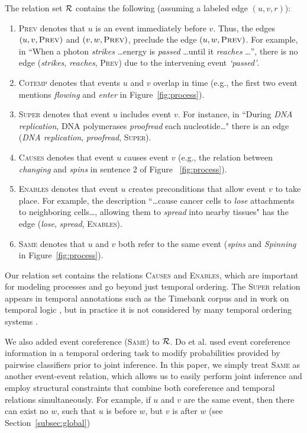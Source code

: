 The relation set $\mathcal{R}$ contains the following (assuming a labeled edge $(u,v,r)$):
\begin{enumerate}[itemsep=0pt,topsep=0pt] 
\item \textsc{Prev} denotes that $u$ is an event immediately before $v$. Thus, the edges $(u,v,\mbox{\textsc{Prev}})$ and $(v,w,\mbox{\textsc{Prev}})$, preclude the edge $(u,w,\mbox{\textsc{Prev}})$. For example, in ``When a photon \emph{strikes} \ldots energy is  \emph{passed} \ldots until it \emph{reaches} \ldots'', there is no edge (\emph{strikes}, \emph{reaches}, \textsc{Prev}) due to the intervening event \emph{`passed'}.
\item \textsc{Cotemp} denotes that events $u$ and $v$ overlap in time (e.g., the first two event mentions \emph{flowing} and \emph{enter} in Figure~\ref{fig:process}).
\item \textsc{Super} denotes that event $u$ includes event $v$. For instance, in ``During \emph{DNA replication}, DNA polymerases \emph{proofread} each nucleotide\ldots" there is an edge (\emph{DNA replication}, \emph{proofread}, \textsc{Super}).
\item \textsc{Causes} denotes that event $u$ causes event $v$ (e.g., the relation between \emph{changing} and \emph{spins} in sentence 2 of Figure ~\ref{fig:process}).
\item \textsc{Enables} denotes that event $u$ creates preconditions that allow event $v$ to take place. For example, the description ``\ldots cause cancer cells  to \emph{lose} attachments to neighboring cells\ldots, allowing them to \emph{spread} into nearby tissues" has the edge (\emph{lose}, \emph{spread}, \textsc{Enables}).
\item \textsc{Same} denotes that $u$ and $v$  both refer to the same event (\emph{spins} and \emph{Spinning} in  Figure~\ref{fig:process}).
\end{enumerate}

Our relation set contains the relations \textsc{Causes} and \textsc{Enables}, which are important for modeling processes and go beyond just temporal ordering. The \textsc{Super} relation appears in temporal annotations such as the Timebank corpus \cite{Pustejovsky03} and in work on temporal logic \cite{Allen83}, but in practice it is not considered by many temporal ordering systems \cite{Chambers08,Yoshikawa09,Do12}. 

We also added event coreference (\textsc{Same}) to $\mathcal{R}$. Do et al.  used event coreference information in a temporal ordering task to modify probabilities provided by pairwise classifiers prior to joint inference. In this paper, we simply treat \textsc{Same} as another event-event relation, which allows us to easily perform joint inference and employ structural constraints that combine both coreference and temporal relations simultaneously. For example, if $u$ and $v$ are the same event, then there can exist no $w$, such that $u$ is before $w$, but $v$ is after $w$ (see Section~\ref{subsec:global})

